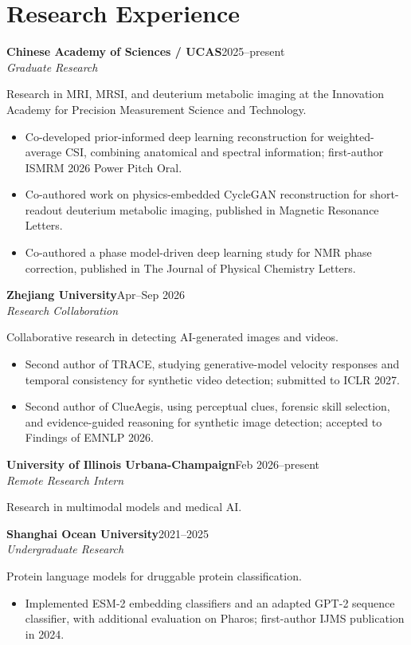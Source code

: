 \documentclass[10pt,letterpaper]{article}
\begin{document}
\section{Research Experience}
\textbf{Chinese Academy of Sciences / UCAS}\hfill 2025--present\\
\textit{Graduate Research}\par
Research in MRI, MRSI, and deuterium metabolic imaging at the Innovation Academy for Precision Measurement Science and Technology.\par
\begin{itemize}
\item Co-developed prior-informed deep learning reconstruction for weighted-average CSI, combining anatomical and spectral information; first-author ISMRM 2026 Power Pitch Oral.
\item Co-authored work on physics-embedded CycleGAN reconstruction for short-readout deuterium metabolic imaging, published in Magnetic Resonance Letters.
\item Co-authored a phase model-driven deep learning study for NMR phase correction, published in The Journal of Physical Chemistry Letters.
\end{itemize}
\vspace{6pt}
\textbf{Zhejiang University}\hfill Apr--Sep 2026\\
\textit{Research Collaboration}\par
Collaborative research in detecting AI-generated images and videos.\par
\begin{itemize}
\item Second author of TRACE, studying generative-model velocity responses and temporal consistency for synthetic video detection; submitted to ICLR 2027.
\item Second author of ClueAegis, using perceptual clues, forensic skill selection, and evidence-guided reasoning for synthetic image detection; accepted to Findings of EMNLP 2026.
\end{itemize}
\vspace{6pt}
\textbf{University of Illinois Urbana-Champaign}\hfill Feb 2026--present\\
\textit{Remote Research Intern}\par
Research in multimodal models and medical AI.\par
\vspace{6pt}
\textbf{Shanghai Ocean University}\hfill 2021--2025\\
\textit{Undergraduate Research}\par
Protein language models for druggable protein classification.\par
\begin{itemize}
\item Implemented ESM-2 embedding classifiers and an adapted GPT-2 sequence classifier, with additional evaluation on Pharos; first-author IJMS publication in 2024.
\end{itemize}
\vspace{6pt}
\end{document}
